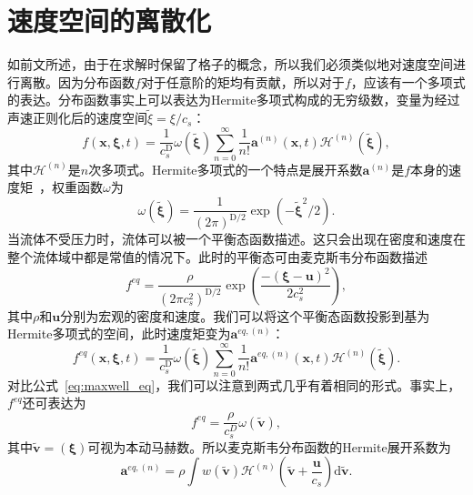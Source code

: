 \section{速度空间的离散化}
如前文所述，由于在求解时保留了格子的概念，所以我们必须类似地对速度空间进行离散。因为分布函数$f$对于任意阶的矩均有贡献，所以对于$f$，应该有一个多项式的表达。分布函数事实上可以表达为Hermite多项式构成的无穷级数，变量为经过声速正则化后的速度空间$\tilde{\xi}=\xi/c_s$：
\begin{equation}
    f(\boldsymbol{x}, \boldsymbol{\xi}, t)=\frac{1}{c_s^{\mathrm{D}}} \omega(\tilde{\boldsymbol{\xi}}) \sum_{n=0}^{\infty} \frac{1}{n !} \boldsymbol{a}^{(n)}(\boldsymbol{x}, t) \mathscr{H}^{(n)}(\tilde{\boldsymbol{\xi}}),
    \label{eq:hermite_f}
\end{equation}
其中$\mathscr{H}^{(n)}$是$n$次多项式。Hermite多项式的一个特点是展开系数$\boldsymbol{a}^{(n)}$是$f$本身的速度矩~\cite{shan2006kinetic}，权重函数$\omega$为
\begin{equation}
    \omega(\tilde{\boldsymbol{\xi}})=\frac{1}{(2 \pi)^{\mathrm{D} / 2}} \exp \left(-\tilde{\boldsymbol{\xi}}^2 / 2\right).
\end{equation}
当流体不受压力时，流体可以被一个平衡态函数描述。这只会出现在密度和速度在整个流体域中都是常值的情况下。此时的平衡态可由麦克斯韦分布函数描述
\begin{equation}
    f^{eq}=\frac{\rho}{\left(2 \pi c_s^2\right)^{\mathrm{D} / 2}} \exp \left(\frac{-(\boldsymbol{\xi}-\boldsymbol{u})^2}{2 c_s^2}\right),
    \label{eq:maxwell_eq}
\end{equation}
其中$\rho$和$\boldsymbol{u}$分别为宏观的密度和速度。我们可以将这个平衡态函数投影到基为Hermite多项式的空间，此时速度矩变为$\boldsymbol{a}^{eq,(n)}$：
\begin{equation}
    f^{eq}(\boldsymbol{x}, \boldsymbol{\xi}, t)=\frac{1}{c_s^{\mathrm{D}}} \omega(\tilde{\boldsymbol{\xi}}) \sum_{n=0}^{\infty} \frac{1}{n !} \boldsymbol{a}^{eq,(n)}(\boldsymbol{x}, t) \mathscr{H}^{(n)}(\tilde{\boldsymbol{\xi}}).
    \label{eq:maxwell_eq_hermite}
\end{equation}
对比公式~\ref{eq:maxwell_eq}，我们可以注意到两式几乎有着相同的形式。事实上，$f^{eq}$还可表达为
\begin{equation}
    f^{eq}=\frac{\rho}{c_s^D}\omega(\tilde{\boldsymbol{v}}),
\end{equation}
其中$\tilde{\boldsymbol{v}}=(\boldsymbol{\xi})$可视为本动马赫数。所以麦克斯韦分布函数的Hermite展开系数为
\begin{equation}
    \boldsymbol{a}^{eq,(n)}=\rho \int w(\tilde{\boldsymbol{v}}) \mathscr{H}^{(n)}\left(\tilde{\boldsymbol{v}}+\frac{\boldsymbol{u}}{c_s}\right) \mathrm{d} \tilde{\boldsymbol{v}}.
    \label{eq:hermite_coefficients}
\end{equation}
